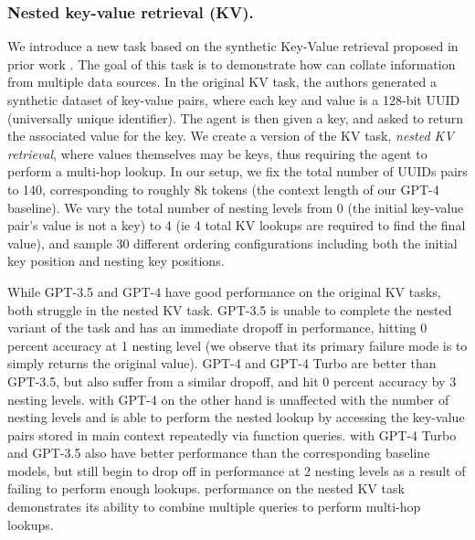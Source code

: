 \subsubsection{Nested key-value retrieval (KV).}
We introduce a new task based on the synthetic Key-Value retrieval proposed in prior work \citep{liu2023lostinmiddle}. The goal of this task is to demonstrate how \ours can collate information from multiple data sources. In the original KV task, the authors generated a synthetic dataset of key-value pairs, where each key and value is a 128-bit UUID (universally unique identifier). The agent is then given a key, and asked to return the associated value for the key. We create a version of the KV task, \emph{nested KV retrieval}, where values themselves may be keys, thus requiring the agent to perform a multi-hop lookup.
In our setup, we fix the total number of UUIDs pairs to 140, corresponding to roughly 8k tokens (the context length of our GPT-4 baseline). We vary the total number of nesting levels from 0 (the initial key-value pair's value is not a key) to 4 (ie 4 total KV lookups are required to find the final value), and sample 30 different ordering configurations including both the initial key position and nesting key positions. 

While GPT-3.5 and GPT-4 have good performance on the original KV tasks, both struggle in the nested KV task. GPT-3.5 is unable to complete the nested variant of the task and has an immediate dropoff in performance, hitting 0 percent accuracy at 1 nesting level (we observe that its primary failure mode is to simply returns the original value). GPT-4 and GPT-4 Turbo are better than GPT-3.5, but also suffer from a similar dropoff, and hit 0 percent accuracy by 3 nesting levels. \ours with GPT-4 on the other hand is unaffected with the number of nesting levels and is able to perform the nested lookup by accessing the key-value pairs stored in main context repeatedly via function queries. \ours with GPT-4 Turbo and GPT-3.5 also have better performance than the corresponding baseline models, but still begin to drop off in performance at 2 nesting levels as a result of failing to perform enough lookups. 
\ours performance on the nested KV task demonstrates its ability to combine multiple queries to perform multi-hop lookups. 












